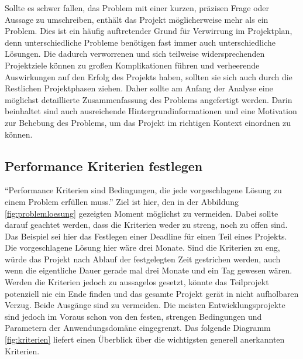     Sollte es schwer fallen, das Problem mit einer kurzen, präzisen Frage oder Aussage zu umschreiben, 
    enthält das Projekt möglicherweise mehr als ein Problem. Dies ist ein häufig auftretender Grund für 
    Verwirrung im Projektplan, denn unterschiedliche Probleme benötigen fast immer auch unterschiedliche 
    Lösungen. Die dadurch verworrenen und sich teilweise widersprechenden Projektziele können zu großen 
    Komplikationen führen und verheerende Auswirkungen auf den Erfolg des Projekts haben, sollten sie 
    sich auch durch die Restlichen Projektphasen ziehen.
    Daher sollte am Anfang der Analyse eine möglichst detaillierte Zusammenfassung des Problems 
    angefertigt werden. Darin beinhaltet sind auch ausreichende Hintergrundinformationen und eine 
    Motivation zur Behebung des Problems, um das Projekt im richtigen Kontext einordnen zu können.

    \subsection{Performance Kriterien festlegen}

    \enquote{Performance Kriterien sind Bedingungen, die jede vorgeschlagene Lösung zu einem Problem erfüllen muss.} 
    Ziel ist hier, den in der Abbildung \ref{fig:problemloesung} gezeigten Moment möglichst zu vermeiden. 
    Dabei sollte darauf geachtet werden, dass die Kriterien weder zu streng, noch zu offen sind. Das 
    Beispiel sei hier das Festlegen einer Deadline für einen Teil eines Projekts. Die vorgeschlagene 
    Lösung hier wäre drei Monate. Sind die Kriterien zu eng, würde das Projekt nach Ablauf der 
    festgelegten Zeit gestrichen werden, auch wenn die eigentliche Dauer gerade mal drei Monate und 
    ein Tag gewesen wären. Werden die Kriterien jedoch zu aussagelos gesetzt, könnte das Teilprojekt 
    potenziell nie ein Ende finden und das gesamte Projekt gerät in nicht aufholbaren Verzug. 
    Beide Ausgänge sind zu vermeiden. Die meisten Entwicklungsprojekte sind jedoch im Voraus schon von den 
    festen, strengen Bedingungen und Parametern der Anwendungsdomäne eingegrenzt. Das folgende Diagramm 
    \ref{fig:kriterien} liefert einen Überblick über die wichtigsten generell anerkannten Kriterien.


